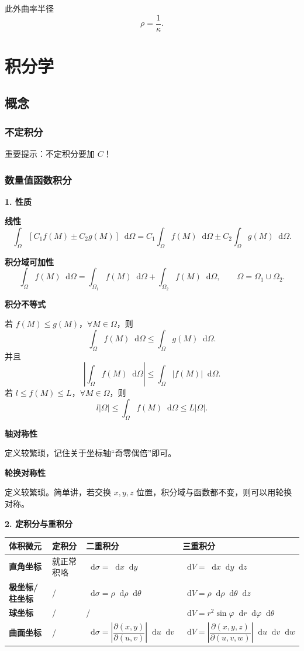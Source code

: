 \documentclass[UTF8,fontset=fandol,zihao=5]{ctexart}
\newcommand{\dd}{\mathop{}\!\mathrm{d}}
\begin{document}
此外曲率半径
\[
\rho=\frac{1}{\kappa}.
\]

\section{积分学}

\subsection{概念}

\subsubsection{不定积分}

重要提示：不定积分要加 $C$！

\subsubsection{数量值函数积分}

\textbf{1. 性质}

\textbf{线性}
\[
\int_{\Omega}\left[C_1f(M)\pm C_2g(M)\right]\dd\Omega
=C_1\int_{\Omega}f(M)\dd\Omega
\pm C_2\int_{\Omega}g(M)\dd\Omega.
\]

\textbf{积分域可加性}
\[
\int_{\Omega}f(M)\dd\Omega
=\int_{\Omega_1}f(M)\dd\Omega
+\int_{\Omega_2}f(M)\dd\Omega,
\qquad \Omega=\Omega_1\cup\Omega_2.
\]

\textbf{积分不等式}

若 $f(M)\leq g(M)$，$\forall M\in\Omega$，则
\[
\int_{\Omega}f(M)\dd\Omega\leq\int_{\Omega}g(M)\dd\Omega.
\]
并且
\[
\left|\int_{\Omega}f(M)\dd\Omega\right|
\leq\int_{\Omega}|f(M)|\dd\Omega.
\]
若 $l\leq f(M)\leq L$，$\forall M\in\Omega$，则
\[
l|\Omega|\leq\int_{\Omega}f(M)\dd\Omega\leq L|\Omega|.
\]

\textbf{轴对称性}

定义较繁琐，记住关于坐标轴“奇零偶倍”即可。

\textbf{轮换对称性}

定义较繁琐。简单讲，若交换 $x,y,z$ 位置，积分域与函数都不变，则可以用轮换对称。

\textbf{2. 定积分与重积分}

\begin{center}
\begin{tabularx}{\textwidth}{>{\bfseries}p{2.4cm}XXX}
\toprule
体积微元 & 定积分 & 二重积分 & 三重积分 \\
\midrule
直角坐标 & 就正常积咯 & $\dd\sigma=\dd x\dd y$ & $\dd V=\dd x\dd y\dd z$ \\
极坐标/柱坐标 & / & $\dd\sigma=\rho\dd\rho\dd\theta$ & $\dd V=\rho\dd\rho\dd\theta\dd z$ \\
球坐标 & / & / & $\dd V=r^2\sin\varphi\dd r\dd\varphi\dd\theta$ \\
曲面坐标 & / & $\dd\sigma=\left|\dfrac{\partial(x,y)}{\partial(u,v)}\right|\dd u\dd v$ & $\dd V=\left|\dfrac{\partial(x,y,z)}{\partial(u,v,w)}\right|\dd u\dd v\dd w$ \\
\bottomrule
\end{tabularx}
\end{center}
\end{document}
